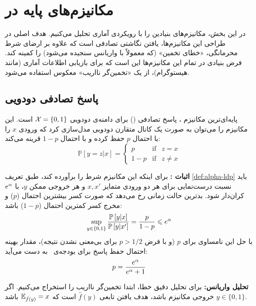 \section{مکانیزم‌های پایه در }
\label{sec:ldp:mechanisms}

در این بخش، مکانیزم‌های بنیادین  را با رویکردی آماری تحلیل می‌کنیم. هدف اصلی در طراحی این مکانیزم‌ها، یافتن نگاشتی تصادفی است که علاوه بر ارضای شرط محرمانگی، «خطای تخمین» (که معمولاً با واریانس سنجیده می‌شود) را کمینه کند. فرض بنیادی در تمام این مکانیزم‌ها این است که برای بازیابی اطلاعات آماری (مانند هیستوگرام)، از یک «تخمین‌گر نااریب» معکوس استفاده می‌شود.

\subsection{پاسخ تصادفی دودویی }
\label{sec:ldp:rr}

پایه‌ای‌ترین مکانیزم \LDP، پاسخ تصادفی () برای دامنه‌ی دودویی $\Xset = \{0, 1\}$ است. این مکانیزم را می‌توان به صورت یک کانال متقارن دودویی مدل‌سازی کرد که ورودی $x$ را با احتمال $p$ حفظ کرده و با احتمال $1-p$ قرینه می‌کند:
\begin{equation}
\mathbb{P}\left[y=z | x\right] = 
\begin{cases}
p & \text{if } \ \ z = x \\
1-p & \text{if } \ \ z \neq x
\end{cases}
\end{equation}

\textbf{اثبات \LDP:}
برای اینکه این مکانیزم شرط \LDP را برآورده کند، طبق تعریف \ref{def:alpha-ldp} باید نسبت درست‌نمایی برای هر دو ورودی متمایز $x, x'$ و هر خروجی ممکن $y$، با $e^{\alpha}$ کران‌دار شود. بدترین حالت زمانی رخ می‌دهد که صورت کسر بیشترین احتمال ($p$) و مخرج کسر کمترین احتمال ($1-p$) باشد:
\begin{equation}
\sup_{y \in \{0,1\}} \frac{\mathbb{P}\left[y|x\right]}{\mathbb{P}\left[y|x'\right]} = \frac{p}{1-p} \leqslant e^{\alpha}
\end{equation}
با حل این نامساوی برای $p$ (و با فرض $p > 1/2$ برای بی‌معنی نشدن نتیجه)، مقدار بهینه احتمال حفظ پاسخ برای بودجه‌ی \al \ به دست می‌آید:
\begin{equation}
p = \frac{e^{\alpha}}{e^{\alpha} + 1}
\end{equation}

\textbf{تحلیل واریانس:}
برای تحلیل دقیق خطا، ابتدا تخمین‌گر نااریب را استخراج می‌کنیم. اگر $y \in \{0, 1\}$ خروجی مکانیزم باشد، هدف یافتن تابعی $\hat{f}(y)$ است که $\Eset[\hat{f}(y)] = x$ باشد.

